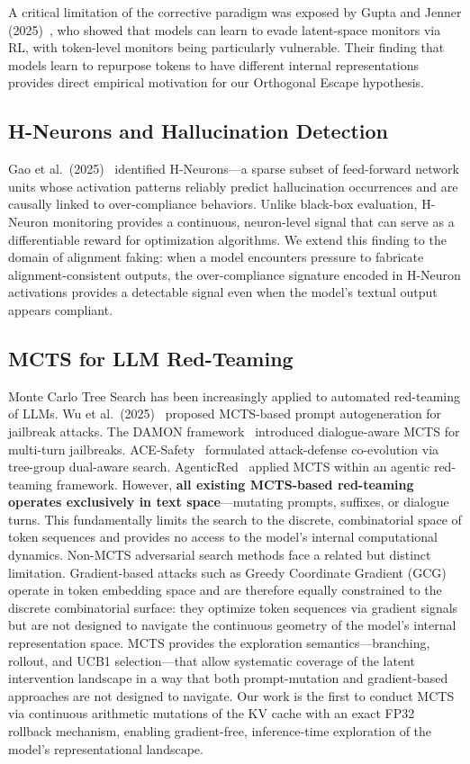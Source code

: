 \documentclass{article}
\begin{document}
A critical limitation of the corrective paradigm was exposed by Gupta and Jenner (2025)~\cite{gupta2025rlobfuscation}, who showed that models can learn to evade latent-space monitors via RL, with token-level monitors being particularly vulnerable. Their finding that models learn to repurpose tokens to have different internal representations provides direct empirical motivation for our Orthogonal Escape hypothesis.

\subsection{H-Neurons and Hallucination Detection}

Gao et al.\ (2025)~\cite{gao2025hneurons} identified H-Neurons---a sparse subset of feed-forward network units whose activation patterns reliably predict hallucination occurrences and are causally linked to over-compliance behaviors. Unlike black-box evaluation, H-Neuron monitoring provides a continuous, neuron-level signal that can serve as a differentiable reward for optimization algorithms. We extend this finding to the domain of alignment faking: when a model encounters pressure to fabricate alignment-consistent outputs, the over-compliance signature encoded in H-Neuron activations provides a detectable signal even when the model's textual output appears compliant.

\subsection{MCTS for LLM Red-Teaming}

Monte Carlo Tree Search has been increasingly applied to automated red-teaming of LLMs. Wu et al.\ (2025)~\cite{wu2025mcts} proposed MCTS-based prompt autogeneration for jailbreak attacks. The DAMON framework~\cite{damon2025} introduced dialogue-aware MCTS for multi-turn jailbreaks. ACE-Safety~\cite{li2025ace} formulated attack-defense co-evolution via tree-group dual-aware search. AgenticRed~\cite{agenticred2025} applied MCTS within an agentic red-teaming framework. However, \textbf{all existing MCTS-based red-teaming operates exclusively in text space}---mutating prompts, suffixes, or dialogue turns. This fundamentally limits the search to the discrete, combinatorial space of token sequences and provides no access to the model's internal computational dynamics. Non-MCTS adversarial search methods face a related but distinct limitation. Gradient-based attacks such as Greedy Coordinate Gradient (GCG)~\cite{zou2023gcg} operate in token embedding space and are therefore equally constrained to the discrete combinatorial surface: they optimize token sequences via gradient signals but are not designed to navigate the continuous geometry of the model's internal representation space. MCTS provides the exploration semantics---branching, rollout, and UCB1 selection---that allow systematic coverage of the latent intervention landscape in a way that both prompt-mutation and gradient-based approaches are not designed to navigate. Our work is the first to conduct MCTS via continuous arithmetic mutations of the KV cache with an exact FP32 rollback mechanism, enabling gradient-free, inference-time exploration of the model's representational landscape.
\end{document}
